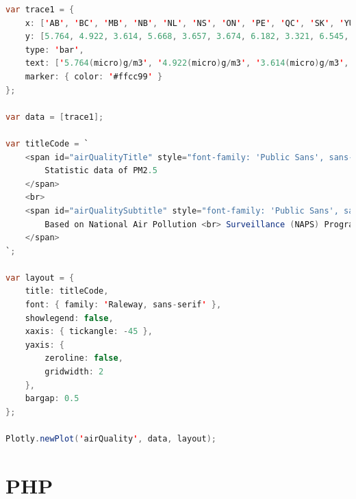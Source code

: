 \documentclass[12pt, letterpaper]{article}
\begin{document}
\begin{lstlisting}[language=java]
var trace1 = {
	x: ['AB', 'BC', 'MB', 'NB', 'NL', 'NS', 'ON', 'PE', 'QC', 'SK', 'YU'],
	y: [5.764, 4.922, 3.614, 5.668, 3.657, 3.674, 6.182, 3.321, 6.545, 4.722, 2.588],
	type: 'bar',
	text: ['5.764(micro)g/m3', '4.922(micro)g/m3', '3.614(micro)g/m3', '5.668(micro)g/m3', '3.657(micro)g/m3', '3.674(micro)g/m3', '6.182(micro)g/m3', '3.321(micro)g/m3', '6.545(micro)g/m3', '4.722(micro)g/m3', '2.588(micro)g/m3'],
	marker: { color: '#ffcc99' }
};

var data = [trace1];

var titleCode = `
	<span id="airQualityTitle" style="font-family: 'Public Sans', sans-serif; font-size: 1.618rem; font-weight: bold;">
		Statistic data of PM2.5 
	</span>
	<br>
	<span id="airQualitySubtitle" style="font-family: 'Public Sans', sans-serif; font-size: 1rem;">
		Based on National Air Pollution <br> Surveillance (NAPS) Program
	</span>
`;

var layout = {
	title: titleCode,
	font: { family: 'Raleway, sans-serif' },
	showlegend: false,
	xaxis: { tickangle: -45 },
	yaxis: {
		zeroline: false,
		gridwidth: 2
	},
	bargap: 0.5
};

Plotly.newPlot('airQuality', data, layout);
\end{lstlisting}

 \newpage

\section{PHP}
\end{document}
